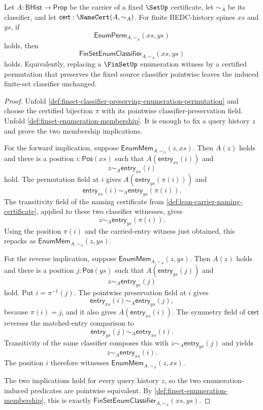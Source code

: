 \begin{theorem}
\label{thm:finset-classifier-enumeration-permutation-invariant}
Let $A:\mathsf{BHist}\to\mathsf{Prop}$ be the carrier of a fixed $\SetUp$ certificate, let $\sim_A$ be its classifier, and let $\mathsf{cert}:\NameCert(A,\sim_A)$. For finite BEDC-history spines $xs$ and $ys$, if
$$
\mathsf{EnumPerm}_{A,\sim_A}(xs,ys)
$$
holds, then
$$
\mathsf{FinSetEnumClassifier}_{A,\sim_A}(xs,ys)
$$
holds. Equivalently, replacing a $\FinSetUp$ enumeration witness by a certified permutation that preserves the fixed source classifier pointwise leaves the induced finite-set classifier unchanged.
\end{theorem}
\begin{proof}
Unfold \autoref{def:finset-classifier-preserving-enumeration-permutation} and choose the certified bijection $\pi$ with its pointwise classifier-preservation field. Unfold \autoref{def:finset-enumeration-membership}. It is enough to fix a query history $z$ and prove the two membership implications.

For the forward implication, suppose $\mathsf{EnumMem}_{A,\sim_A}(z,xs)$. Then $A(z)$ holds and there is a position $i:\mathsf{Pos}(xs)$ such that $A(\mathsf{entry}_{xs}(i))$ and
$$
z\sim_A\mathsf{entry}_{xs}(i)
$$
hold. The permutation field at $i$ gives $A(\mathsf{entry}_{ys}(\pi(i)))$ and
$$
\mathsf{entry}_{xs}(i)\sim_A\mathsf{entry}_{ys}(\pi(i)).
$$
The transitivity field of the naming certificate from \autoref{def:lean-carrier-naming-certificate}, applied to these two classifier witnesses, gives
$$
z\sim_A\mathsf{entry}_{ys}(\pi(i)).
$$
Using the position $\pi(i)$ and the carried-entry witness just obtained, this repacks as $\mathsf{EnumMem}_{A,\sim_A}(z,ys)$.

For the reverse implication, suppose $\mathsf{EnumMem}_{A,\sim_A}(z,ys)$. Then $A(z)$ holds and there is a position $j:\mathsf{Pos}(ys)$ such that $A(\mathsf{entry}_{ys}(j))$ and
$$
z\sim_A\mathsf{entry}_{ys}(j)
$$
hold. Put $i=\pi^{-1}(j)$. The pointwise preservation field at $i$ gives
$$
\mathsf{entry}_{xs}(i)\sim_A\mathsf{entry}_{ys}(j),
$$
because $\pi(i)=j$, and it also gives $A(\mathsf{entry}_{xs}(i))$. The symmetry field of $\mathsf{cert}$ reverses the matched-entry comparison to
$$
\mathsf{entry}_{ys}(j)\sim_A\mathsf{entry}_{xs}(i).
$$
Transitivity of the same classifier composes this with $z\sim_A\mathsf{entry}_{ys}(j)$ and yields
$$
z\sim_A\mathsf{entry}_{xs}(i).
$$
The position $i$ therefore witnesses $\mathsf{EnumMem}_{A,\sim_A}(z,xs)$.

The two implications hold for every query history $z$, so the two enumeration-induced predicates are pointwise equivalent. By \autoref{def:finset-enumeration-membership}, this is exactly $\mathsf{FinSetEnumClassifier}_{A,\sim_A}(xs,ys)$.
\end{proof}

